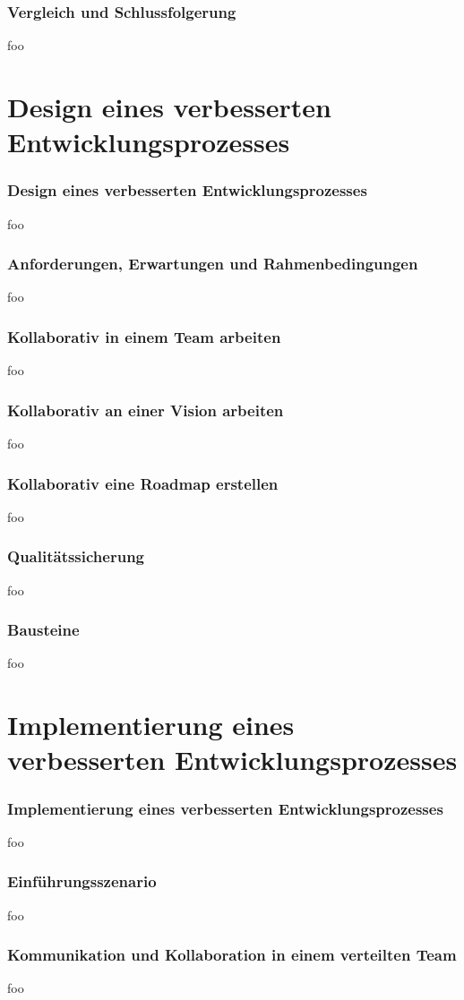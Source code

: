 \documentclass{beamer}
\begin{document}
\begin{frame}
\frametitle{Vergleich und Schlussfolgerung}
foo
\end{frame}

\section{Design eines verbesserten Entwicklungsprozesses}

\begin{frame}
\frametitle{Design eines verbesserten Entwicklungsprozesses}
foo
\end{frame}

\begin{frame}
\frametitle{Anforderungen, Erwartungen und Rahmenbedingungen}
foo
\end{frame}

\begin{frame}
\frametitle{Kollaborativ in einem Team arbeiten}
foo
\end{frame}

\begin{frame}
\frametitle{Kollaborativ an einer Vision arbeiten}
foo
\end{frame}

\begin{frame}
\frametitle{Kollaborativ eine Roadmap erstellen}
foo
\end{frame}

\begin{frame}
\frametitle{Qualit\"atssicherung}
foo
\end{frame}

\begin{frame}
\frametitle{Bausteine}
foo
\end{frame}

\section{Implementierung eines verbesserten Entwicklungsprozesses}

\begin{frame}
\frametitle{Implementierung eines verbesserten Entwicklungsprozesses}
foo
\end{frame}

\begin{frame}
\frametitle{Einf\"uhrungsszenario}
foo
\end{frame}

\begin{frame}
\frametitle{Kommunikation und Kollaboration in einem verteilten Team}
foo
\end{frame}
\end{document}
